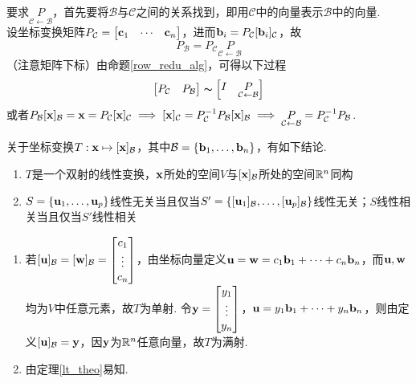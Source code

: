 \begin{myalgorithm}[在$\rn$中换基]
要求$\underset{\mathcal{C}\gets \mathcal{B}}{P}$，首先要将$\mathcal{B}$与$\mathcal{C}$之间的关系找到，即用$\mathcal{C}$中的向量表示$\mathcal{B}$中的向量.\\
设坐标变换矩阵$P_\mathcal{C}=\begin{bmatrix}{\mathbf{c}_1}&\cdots&{\mathbf{c}_n}\end{bmatrix}$，进而$\mathbf{b}_i=P_{\mathcal{C}}[\mathbf{b}_i]_{\mathcal{C}}$，故
\[P_{\mathcal{B}}=P_{\mathcal{C}}\underset{\mathcal{C}\gets \mathcal{B}}{P}\]
（注意矩阵下标）由命题\ref{row_redu_alg}，可得以下过程
\[\begin{bmatrix}P_\mathcal{C}&P_\mathcal{B}\end{bmatrix}\thicksim\begin{bmatrix}I&\underset{\mathcal{C}\gets \mathcal{B}}{P}\end{bmatrix}\]
或者$P_\mathcal{B}[\mathbf{x}]_\mathcal{B}=\mathbf{x}=P_\mathcal{C}[\mathbf{x}]_\mathcal{C}\implies [\mathbf{x}]_\mathcal{C}=P_\mathcal{C}^{-1}P_\mathcal{B}[\mathbf{x}]_\mathcal{B}\implies \underset{\mathcal{C}\gets \mathcal{B}}{P}=P_{\mathcal{C}}^{-1}P_{\mathcal{B}}$.
\end{myalgorithm}
\begin{theorem}%
关于坐标变换$T:\mathbf{x}\mapsto[\mathbf{x}]_{\mathcal{B}}$，其中$\mathcal{B}=\{\mathbf{b}_1,\dots,\mathbf{b}_n\}$，有如下结论.
\begin{enumerate}
	\itemsep -3pt
	\item $T$是一个双射的线性变换，$\mathbf{x}$所处的空间$V$与$[\mathbf{x}]_\mathcal{B}$所处的空间$\rn$同构
	\item $S=\{\mathbf{u}_1,\dots,\mathbf{u}_p\}$线性无关当且仅当$S'=\left\{[\mathbf{u}_1]_\mathcal{B},\dots,[\mathbf{u}_p]_\mathcal{B}\right\}$线性无关；$S$线性相关当且仅当$S'$线性相关
\end{enumerate}
\end{theorem}
\begin{analysis}
\begin{enumerate}
	\itemsep -3pt
	\item 若$[\mathbf{u}]_\mathcal{B}=[\mathbf{w}]_\mathcal{B}=\begin{bmatrix}c_1\\\vdots\\c_n\end{bmatrix}$，由坐标向量定义$\mathbf{u}=\mathbf{w}=c_1\mathbf{b}_1+\cdots+c_n\mathbf{b}_n$，而$\mathbf{u},\mathbf{w}$均为$V$中任意元素，故$T$为单射. 令$\mathbf{y}=\begin{bmatrix}y_1\\\vdots\\y_n\end{bmatrix}$，$\mathbf{u}=y_1\mathbf{b}_1+\cdots+y_n\mathbf{b}_n$，则由定义$[\mathbf{u}]_\mathcal{B}=\mathbf{y}$，因$\mathbf{y}$为$\rn$任意向量，故$T$为满射.
	\item 由定理\ref{lt_theo}易知.
\end{enumerate}
\end{analysis}